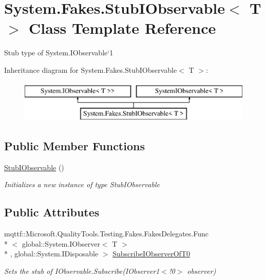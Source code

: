 \hypertarget{class_system_1_1_fakes_1_1_stub_i_observable_3_01_t_01_4}{\section{System.\-Fakes.\-Stub\-I\-Observable$<$ T $>$ Class Template Reference}
\label{class_system_1_1_fakes_1_1_stub_i_observable_3_01_t_01_4}
}


Stub type of System.\-I\-Observable`1 


Inheritance diagram for System.\-Fakes.\-Stub\-I\-Observable$<$ T $>$\-:\begin{figure}[H]
\begin{center}
\leavevmode
\includegraphics[height=2.000000cm]{class_system_1_1_fakes_1_1_stub_i_observable_3_01_t_01_4}
\end{center}
\end{figure}
\subsection*{Public Member Functions}
\begin{DoxyCompactItemize}
\item 
\hyperlink{class_system_1_1_fakes_1_1_stub_i_observable_3_01_t_01_4_ad856871efaa5091b6575c4eeccb60759}{Stub\-I\-Observable} ()
\begin{DoxyCompactList}\small\item\em Initializes a new instance of type Stub\-I\-Observable\end{DoxyCompactList}\end{DoxyCompactItemize}
\subsection*{Public Attributes}
\begin{DoxyCompactItemize}
\item 
mqttf\-::\-Microsoft.\-Quality\-Tools.\-Testing.\-Fakes.\-Fakes\-Delegates.\-Func\\*
$<$ global\-::\-System.\-I\-Observer$<$ T $>$\\*
, global\-::\-System.\-I\-Disposable $>$ \hyperlink{class_system_1_1_fakes_1_1_stub_i_observable_3_01_t_01_4_ab3adff6ecd31842e84dd271de039b3ea}{Subscribe\-I\-Observer\-Of\-T0}
\begin{DoxyCompactList}\small\item\em Sets the stub of I\-Observable{.\-Subscribe(I\-Observer}1$<$!0$>$ observer)\end{DoxyCompactList}\end{DoxyCompactItemize}


